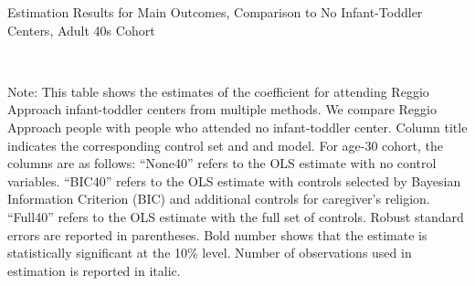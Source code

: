 \begin{table}[H] \caption{Estimation Results for Main Outcomes, Comparison to No Infant-Toddler Centers, Adult 40s Cohort} \label{ols-M-adult40-reg-nopres-asilo}
\scalebox{0.75}{}
\vspace{1ex} \\
\footnotesize\raggedright{Note: This table shows the estimates of the coefficient for attending Reggio Approach infant-toddler centers from multiple methods. We compare Reggio Approach people with people who attended no infant-toddler center. Column title indicates the corresponding control set and and model. For age-30 cohort, the columns are as follows: ``None40'' refers to the OLS estimate with no control variables. ``BIC40'' refers to the OLS estimate with controls selected by Bayesian Information Criterion (BIC) and additional controls for caregiver's religion. ``Full40'' refers to the OLS estimate with the full set of controls. Robust standard errors are reported in parentheses. Bold number shows that the estimate is statistically significant at the 10\% level. Number of observations used in estimation is reported in italic.}
\end{table}








